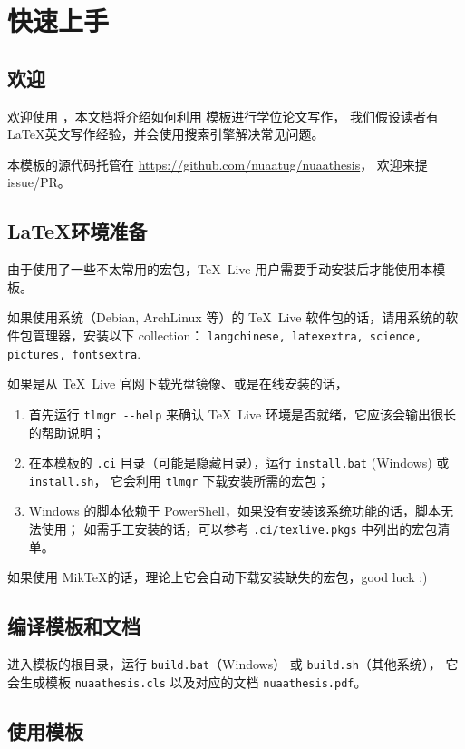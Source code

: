 \chapter{快速上手}

\section{欢迎}

欢迎使用 \nuaathesis，本文档将介绍如何利用 \nuaathesis 模板进行学位论文写作，
我们假设读者有 \LaTeX 英文写作经验，并会使用搜索引擎解决常见问题。

本模板的源代码托管在 \url{https://github.com/nuaatug/nuaathesis}，
欢迎来提 issue/PR。

\section{\LaTeX 环境准备}

由于\nuaathesis 使用了一些不太常用的宏包，\TeX~Live 用户需要手动安装后才能使用本模板。

如果使用系统（Debian, ArchLinux 等）的 \TeX~Live 软件包的话，请用系统的软件包管理器，安装以下 collection：
\verb|langchinese, latexextra, science, pictures, fontsextra|.

如果是从 \TeX~Live 官网下载光盘镜像、或是在线安装的话，
\begin{enumerate}
  \item 首先运行 \verb|tlmgr --help| 来确认 \TeX~Live 环境是否就绪，它应该会输出很长的帮助说明；
  \item 在本模板的 \verb|.ci| 目录（可能是隐藏目录），运行 \verb|install.bat| (Windows) 或 \verb|install.sh|，
  它会利用 \verb|tlmgr| 下载安装所需的宏包；
  \item Windows 的脚本依赖于 PowerShell，如果没有安装该系统功能的话，脚本无法使用；
  如需手工安装的话，可以参考 \verb|.ci/texlive.pkgs| 中列出的宏包清单。
\end{enumerate}

如果使用 Mik\TeX 的话，理论上它会自动下载安装缺失的宏包，good luck :)

\section{编译模板和文档}

进入模板的根目录，运行 \verb|build.bat|（Windows） 或 \verb|build.sh|（其他系统），
它会生成模板 \verb|nuaathesis.cls| 以及对应的文档 \verb|nuaathesis.pdf|。

\section{使用模板}

